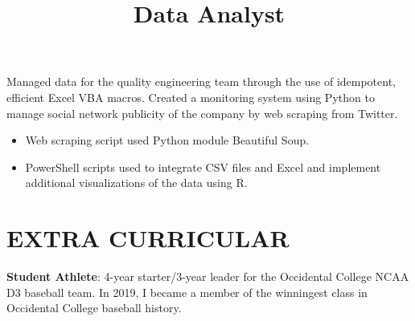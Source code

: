 \documentclass[margin]{res}
\begin{document}
\begin{resume}
\title{\textbf{Data Analyst}}
\begin{position}
	Managed data for the quality engineering team through the use of idempotent, efficient Excel VBA macros. Created a monitoring system using Python to manage social network publicity of the company by web scraping from Twitter.
	\begin{itemize}
		\item Web scraping script used Python module Beautiful Soup.
		\item PowerShell scripts used to integrate CSV files and Excel and implement additional visualizations of the data using R.
	\end{itemize}
\end{position}




\section{EXTRA CURRICULAR}
\par
\par
\textbf{Student Athlete}: 4-year starter/3-year leader for the Occidental College NCAA D3 baseball team. In 2019, I became a member of the winningest class in Occidental College baseball history.
\par


\end{resume}
\end{document}
